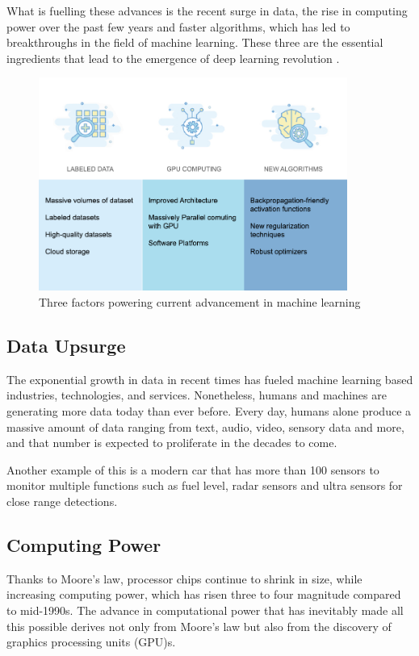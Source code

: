 What is fuelling these advances is the recent surge in data, the rise in computing power over the past few years and faster algorithms, which has led to breakthroughs in the field of machine learning. These three are the essential ingredients that lead to the emergence of deep learning revolution \cite{gerrish_how_2018}.

\begin{figure}[htbp]
\centering
\includegraphics[width=0.90\textwidth]{images/bg-drive-factors.png}
\caption{Three factors powering current advancement in machine learning}
\label{3-factors}
\end{figure}

\subsection{Data Upsurge}
The exponential growth in data in recent times has fueled machine learning based industries, technologies, and services. Nonetheless, humans and machines are generating more data today than ever before. Every day, humans alone produce a massive amount of data ranging from text, audio, video, sensory data and more, and that number is expected to proliferate in the decades to come. 

Another example of this is a modern car that has more than 100 sensors to monitor multiple functions such as fuel level, radar sensors and ultra sensors for close range detections.

\subsection{Computing Power}
Thanks to Moore’s law, processor chips continue to shrink in size, while increasing computing power, which has risen three to four magnitude compared to mid-1990s. The advance in computational power that has inevitably made all this possible derives not only from Moore’s law but also from the discovery of graphics processing units (GPU)s. 

